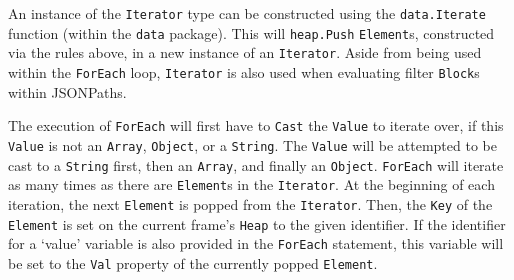 An instance of the \verb|Iterator| type can be constructed using the \verb|data.Iterate| function (within the \verb|data| package). This will \verb|heap.Push| \verb|Element|s, constructed via the rules above, in a new instance of an \verb|Iterator|. Aside from being used within the \verb|ForEach| loop, \verb|Iterator| is also used when evaluating filter \verb|Block|s within JSONPaths.

The execution of \verb|ForEach| will first have to \verb|Cast| the \verb|Value| to iterate over, if this \verb|Value| is not an \verb|Array|, \verb|Object|, or a \verb|String|. The \verb|Value| will be attempted to be cast to a \verb|String| first, then an \verb|Array|, and finally an \verb|Object|. \verb|ForEach| will iterate as many times as there are \verb|Element|s in the \verb|Iterator|. At the beginning of each iteration, the next \verb|Element| is popped from the \verb|Iterator|. Then, the \verb|Key| of the \verb|Element| is set on the current frame's \verb|Heap| to the given identifier. If the identifier for a `value' variable is also provided in the \verb|ForEach| statement, this variable will be set to the \verb|Val| property of the currently popped \verb|Element|.
